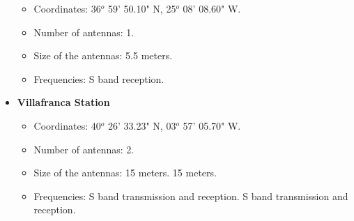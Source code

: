 \begin{itemize}
\begin{itemize}
\item Coordinates: 36$^{o}$ 59' 50.10" N, 25$^{o}$ 08' 08.60" W.
\item Number of antennas: 1.
\item Size of the antennas: 5.5 meters.
\item Frequencies: S band reception.
\end{itemize}
\item \textbf{Villafranca Station}
\begin{itemize}
\item Coordinates: 40$^{o}$ 26' 33.23" N, 03$^{o}$ 57' 05.70" W.
\item Number of antennas: 2.
\item Size of the antennas: 15 meters. 15 meters.
\item Frequencies: S band transmission and reception. S band transmission and reception.
\end{itemize}
\end{itemize}

